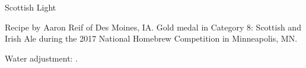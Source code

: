 \begin{recipe}{Scottish Light} %

\begin{aboutblock}
Recipe by Aaron Reif of Des Moines, IA. Gold medal in Category 8: Scottish and
Irish Ale during the 2017 National Homebrew Competition in Minneapolis, MN.
\sourceaha
\end{aboutblock}


\begin{methodandtiming}

\begin{mashsteps}
\end{mashsteps}

\begin{fermentationsteps}
\end{fermentationsteps}

\begin{directions}
Water adjustment: . %
\end{directions}

\end{methodandtiming}

\recipebreak

\begin{ingredientsblock}

\begin{malts}
\end{malts}

\begin{hops}
\end{hops}


\end{ingredientsblock}

\end{recipe}

